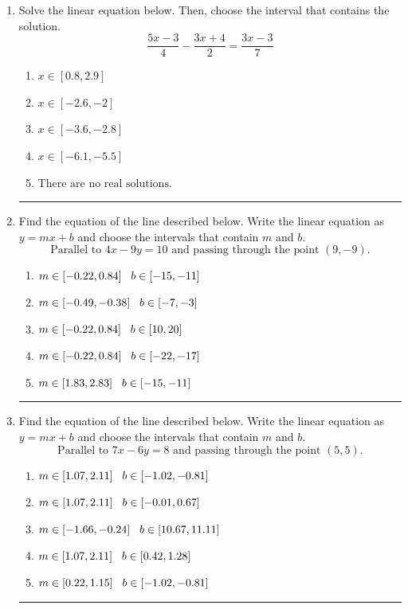 \documentclass[14pt]{extbook}
\newcommand{\litem}[1]{\item#1\hspace*{-1cm}\rule{\textwidth}{0.4pt}}
\begin{document}
\begin{enumerate}
\litem{
Solve the linear equation below. Then, choose the interval that contains the solution.\[ \frac{5x -3}{4} - \frac{3x + 4}{2} = \frac{3x -3}{7} \]\begin{enumerate}[label=\Alph*.]
\item \( x \in [0.8, 2.9] \)
\item \( x \in [-2.6, -2] \)
\item \( x \in [-3.6, -2.8] \)
\item \( x \in [-6.1, -5.5] \)
\item \( \text{There are no real solutions.} \)

\end{enumerate} }
\litem{
Find the equation of the line described below. Write the linear equation as $ y=mx+b $ and choose the intervals that contain $m$ and $b$.\[ \text{Parallel to } 4 x - 9 y = 10 \text{ and passing through the point } (9, -9). \]\begin{enumerate}[label=\Alph*.]
\item \( m \in [-0.22, 0.84] \hspace*{3mm} b \in [-15, -11] \)
\item \( m \in [-0.49, -0.38] \hspace*{3mm} b \in [-7, -3] \)
\item \( m \in [-0.22, 0.84] \hspace*{3mm} b \in [10, 20] \)
\item \( m \in [-0.22, 0.84] \hspace*{3mm} b \in [-22, -17] \)
\item \( m \in [1.83, 2.83] \hspace*{3mm} b \in [-15, -11] \)

\end{enumerate} }
\litem{
Find the equation of the line described below. Write the linear equation as $ y=mx+b $ and choose the intervals that contain $m$ and $b$.\[ \text{Parallel to } 7 x - 6 y = 8 \text{ and passing through the point } (5, 5). \]\begin{enumerate}[label=\Alph*.]
\item \( m \in [1.07, 2.11] \hspace*{3mm} b \in [-1.02, -0.81] \)
\item \( m \in [1.07, 2.11] \hspace*{3mm} b \in [-0.01, 0.67] \)
\item \( m \in [-1.66, -0.24] \hspace*{3mm} b \in [10.67, 11.11] \)
\item \( m \in [1.07, 2.11] \hspace*{3mm} b \in [0.42, 1.28] \)
\item \( m \in [0.22, 1.15] \hspace*{3mm} b \in [-1.02, -0.81] \)


\end{enumerate}}
\end{enumerate}
\end{document}
